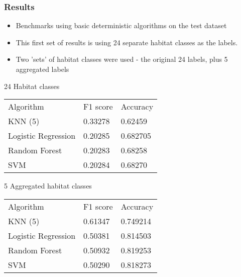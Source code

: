 \documentclass{beamer}
\begin{document}
\begin{frame}
    \frametitle{Results}

    \begin{itemize}
        \item Benchmarks using basic deterministic algorithms on the test dataset
        \item This first set of results is using 24 separate habitat classes as the labels.
        \item Two 'sets' of habitat classes were used - the original 24 labels, plus 5 aggregated labels
    \end{itemize}

    {\scriptsize
    24 Habitat classes

    \begin{tabular}{| l | l | l |}
        Algorithm           & F1 score & Accuracy \\
        KNN (5)             & 0.33278 & 0.62459 \\
        Logistic Regression & 0.20285 & 0.682705 \\
        Random Forest       & 0.20283 & 0.68258 \\
        SVM                 & 0.20284 & 0.68270 \\
    \end{tabular}

    5 Aggregated habitat classes

    \begin{tabular}{| l | l | l |}
        Algorithm           & F1 score & Accuracy \\
        KNN (5)             & 0.61347 & 0.749214 \\
        Logistic Regression & 0.50381 & 0.814503 \\
        Random Forest       & 0.50932 & 0.819253 \\
        SVM                 & 0.50290 & 0.818273 \\
    \end{tabular}
    }
\end{frame}
\end{document}
